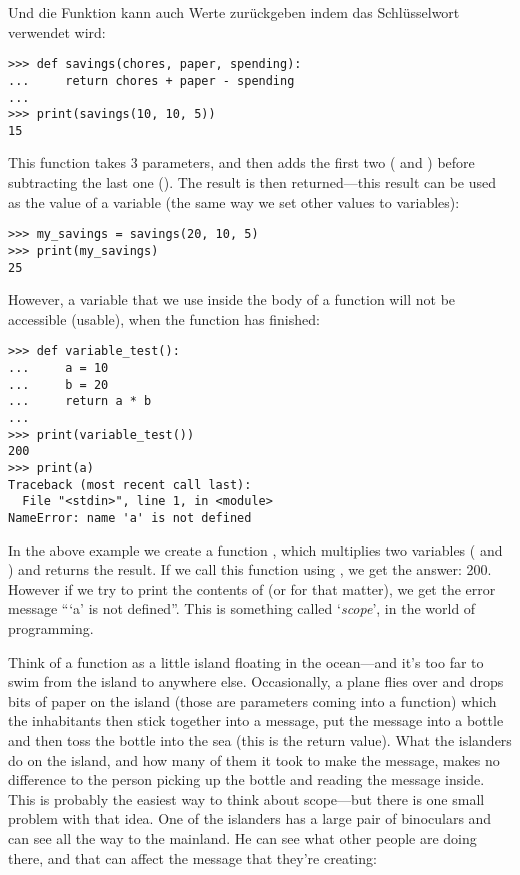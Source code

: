 \noindent
Und die Funktion kann auch Werte zurückgeben indem das  Schlüsselwort verwendet wird:

\begin{Verbatim}[frame=single]
>>> def savings(chores, paper, spending):
...     return chores + paper - spending
...
>>> print(savings(10, 10, 5))
15
\end{Verbatim}

This function takes 3 parameters, and then adds the first two ( and ) before subtracting the last one ().  The result is then returned---this result can be used as the value of a variable (the same way we set other values to variables):

\begin{Verbatim}[frame=single]
>>> my_savings = savings(20, 10, 5)
>>> print(my_savings)
25
\end{Verbatim}

\noindent
However, a variable that we use inside the body of a function will not be accessible (usable), when the function has finished:

\begin{Verbatim}[frame=single]
>>> def variable_test():
...     a = 10
...     b = 20
...     return a * b
...
>>> print(variable_test())
200
>>> print(a)
Traceback (most recent call last):
  File "<stdin>", line 1, in <module>
NameError: name 'a' is not defined
\end{Verbatim}

In the above example we create a function , which multiplies two variables ( and ) and returns the result.  If we call this function using , we get the answer: 200.  However if we try to print the contents of  (or  for that matter), we get the error message ```a' is not defined''. This is something called `\emph{scope}', in the world of programming.
\par
Think of a function as a little island floating in the ocean---and it's too far to swim from the island to anywhere else.  Occasionally, a plane flies over and drops bits of paper on the island (those are parameters coming into a function) which the inhabitants then stick together into a message, put the message into a bottle and then toss the bottle into the sea (this is the return value).  What the islanders do on the island, and how many of them it took to make the message, makes no difference to the person picking up the bottle and reading the message inside.  This is probably the easiest way to think about scope---but there is one small problem with that idea.  One of the islanders has a large pair of binoculars and can see all the way to the mainland.  He can see what other people are doing there, and that can affect the message that they're creating:

